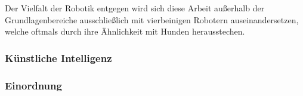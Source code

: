 
Der Vielfalt der Robotik entgegen wird sich diese Arbeit außerhalb der Grundlagenbereiche ausschließlich mit vierbeinigen Robotern auseinandersetzen, welche oftmals durch ihre Ähnlichkeit mit Hunden herausstechen.

\subsubsection{Künstliche Intelligenz}


\subsubsection{Einordnung}

